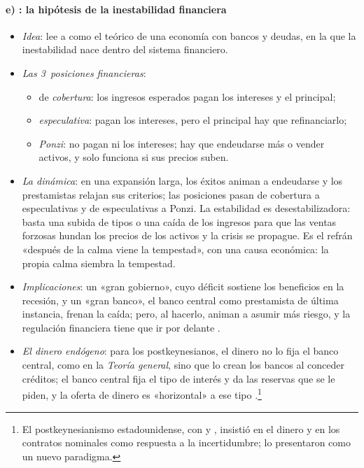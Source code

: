 \documentclass[11pt]{article}
\begin{document}
\paragraph{e) : la hipótesis de la inestabilidad financiera}

\begin{itemize}
\item \emph{Idea}:  lee a  como el teórico de una economía con bancos y deudas, en la que la inestabilidad nace dentro del sistema financiero\nocite{Minsky1975Keynes,Minsky1986Stabilizing}.
\item \emph{Las 3~posiciones financieras}\nocite{Minsky1992Financial}:
  \begin{itemize}
  \item de \emph{cobertura}: los ingresos esperados pagan los intereses y el principal;
  \item \emph{especulativa}: pagan los intereses, pero el principal hay que refinanciarlo;
  \item \emph{Ponzi}: no pagan ni los intereses; hay que endeudarse más o vender activos, y solo funciona si sus precios suben.
  \end{itemize}
\item \emph{La dinámica}: en una expansión larga, los éxitos animan a endeudarse y los prestamistas relajan sus criterios; las posiciones pasan de cobertura a especulativas y de especulativas a Ponzi. La estabilidad es desestabilizadora: basta una subida de tipos o una caída de los ingresos para que las ventas forzosas hundan los precios de los activos y la crisis se propague. Es el refrán «después de la calma viene la tempestad», con una causa económica: la propia calma siembra la tempestad.
\item \emph{Implicaciones}: un «gran gobierno», cuyo déficit sostiene los beneficios en la recesión, y un «gran banco», el banco central como prestamista de última instancia, frenan la caída; pero, al hacerlo, animan a asumir más riesgo, y la regulación financiera tiene que ir por delante\nocite{Minsky1986Stabilizing} .
\item \emph{El dinero endógeno}: para los postkeynesianos, el dinero no lo fija el banco central, como en la \emph{Teoría general}, sino que lo crean los bancos al conceder créditos; el banco central fija el tipo de interés y da las reservas que se le piden, y la oferta de dinero es «horizontal» a ese tipo\nocite{Kaldor1982Scourge,Moore1988Horizontalists} .\footnote{El postkeynesianismo estadounidense, con \textcite{Davidson1972Money} y , insistió en el dinero y en los contratos nominales como respuesta a la incertidumbre; \textcite{KregelEichner1975Essay} lo presentaron como un nuevo paradigma.}
\end{itemize}
\end{document}
